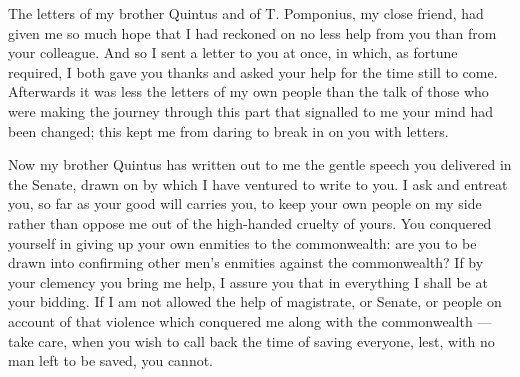 

 The letters of my brother Quintus and of T. Pomponius, my close friend, had given me so much hope that I had reckoned on no less help from you than from your colleague. And so I sent a letter to you at once, in which, as fortune required, I both gave you thanks and asked your help for the time still to come. Afterwards it was less the letters of my own people than the talk of those who were making the journey through this part that signalled to me your mind had been changed; this kept me from daring to break in on you with letters.

 Now my brother Quintus has written out to me the gentle speech you delivered in the Senate, drawn on by which I have ventured to write to you. I ask and entreat you, so far as your good will carries you, to keep your own people on my side rather than oppose me out of the high-handed cruelty of yours. You conquered yourself in giving up your own enmities to the commonwealth: are you to be drawn into confirming other men's enmities against the commonwealth? If by your clemency you bring me help, I assure you that in everything I shall be at your bidding. If I am not allowed the help of magistrate, or Senate, or people on account of that violence which conquered me along with the commonwealth --- take care, when you wish to call back the time of saving everyone, lest, with no man left to be saved, you cannot.
